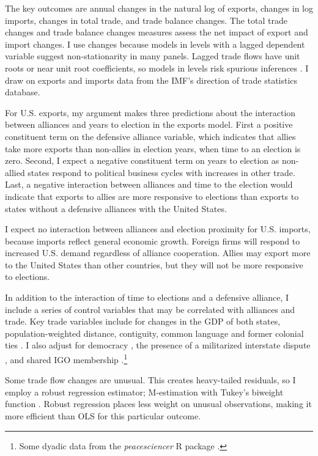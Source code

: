 \documentclass[12pt]{article}
\begin{document}
The key outcomes are annual changes in the natural log of exports, changes in log imports, changes in total trade, and trade balance changes.
The total trade changes and trade balance changes measures assess the net impact of export and import changes.
I use changes because models in levels with a lagged dependent variable suggest non-stationarity in many panels. 
Lagged trade flows have unit roots or near unit root coefficients, so models in levels risk spurious inferences \citep{GrangerNewbold1974}.
I draw on exports and imports data from the IMF's direction of trade statistics database.


For U.S. exports, my argument makes three predictions about the interaction between alliances and years to election in the exports model. 
First a positive constituent term on the defensive alliance variable, which indicates that allies take more exports than non-allies in election years, when time to an election is zero.
Second, I expect a negative constituent term on years to election as non-allied states respond to political business cycles with increases in other trade. 
Last, a negative interaction between alliances and time to the election would indicate that exports to allies are more responsive to elections than exports to states without a defensive alliances with the United States.


I expect no interaction between alliances and election proximity for U.S. imports, because imports reflect general economic growth.
Foreign firms will respond to increased U.S. demand regardless of alliance cooperation.  
Allies may export more to the United States than other countries, but they will not be more responsive to elections.


In addition to the interaction of time to elections and a defensive alliance, I include a series of control variables that may be correlated with alliances and trade. 
Key trade variables include for changes in the GDP of both states, population-weighted distance, contiguity, common language and former colonial ties \citep{FouquinHugot2016}.
I also adjust for democracy \citep{Marquez2016}, the presence of a militarized interstate dispute \citep{Gibleretal2016}, and shared IGO membership \citep{Pevehouseetal2020}.\footnote{Some dyadic data from the \textit{peacesciencer} \textsf{R} package \citep{peacesciencer-package}.}


Some trade flow changes are unusual. 
This creates heavy-tailed residuals, so I employ a robust regression estimator; M-estimation with Tukey's biweight function \citep{RaineyBaissa2020}.
Robust regression places less weight on unusual observations, making it more efficient than OLS for this particular outcome.
\end{document}
